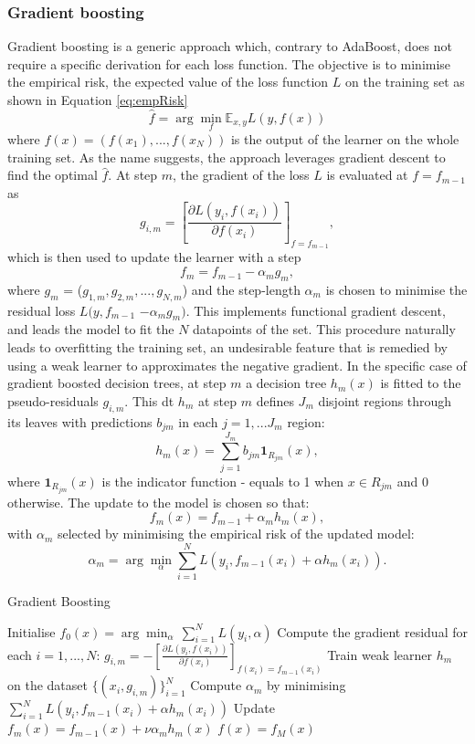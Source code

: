 \subsubsection{Gradient boosting}
Gradient boosting is a generic approach which, contrary to AdaBoost, does not require a specific derivation for each loss function. The objective is to minimise the empirical risk, the expected value of the loss function $L$ on the training set as shown in Equation \ref{eq:empRisk} 
\begin{equation}\label{eq:empRisk}
    \hat{f}  = \arg \min_f \mathbb{E}_{x,y} L(y, f(x))
\end{equation}
where $f(x) = (f(x_1), ..., f(x_N))$ is the output of the learner on the whole training set. As the name suggests, the approach leverages gradient descent to find the optimal $\hat{f}$. At step $m$, the gradient of the loss $L$ is evaluated at $f = f_{m-1}$ as \[ g_{i,m} = \left[ \frac{\partial  L(y_i, f(x_i))}{\partial f(x_i)} \right]_{f= f_{m-1}}, \] which is then used to update the learner with a step \[ f_m = f_{m-1} - \alpha_m g_{m},\] where $g_m$ = ($g_{1, m}, g_{2, m}, ..., g_{N,m}$) and the step-length $\alpha_m$ is chosen to minimise the residual loss $L(y, f_{m-1}$ $- \alpha_m g_{m})$. This implements functional gradient descent, and leads the model to fit the $N$ datapoints of the set. This procedure naturally leads to overfitting the training set, an undesirable feature that is remedied by using a weak learner to approximates the negative gradient. In the specific case of gradient boosted decision trees, at step $m$ a decision tree $h_m(x)$ is fitted to the pseudo-residuals $g_{i,m}$. This \gls{dt} $h_m$ at step $m$ defines $J_m$ disjoint regions through its leaves with predictions $b_{jm}$ in each $j = 1, ... J_m$ region: \[ h_m(x) = \sum_{j=1}^{J_m} b_{jm} \textbf{1}_{R_{jm}}(x),\] where $\textbf{1}_{R_{jm}}(x)$ is the indicator function - equals to 1 when $x \in R_{jm}$ and 0 otherwise. The update to the model is chosen so that: \[f_m(x) = f_{m-1} + \alpha_m h_m(x),\] with $\alpha_m$ selected by minimising the empirical risk of the updated model: \[ \alpha_m = \arg \min_{\alpha} \sum_{i=1}^N L(y_i, f_{m-1}(x_i) + \alpha h_m(x_i)).\]

\begin{algorithm}
    \caption{Gradient Boosting \cite{MurphyML}}
    \label{algo:gradient_boosting}
    \begin{algorithmic}
    \State Initialise $f_0(x) = \arg\min_\alpha \,\sum_{i=1}^N L(y_i, \alpha)$
        \State Compute the gradient residual for each $i= 1, ..., N$: $g_{i,m} = -\left[\frac{\partial L(y_i, f(x_i))}{\partial f(x_i)}\right]_{f(x_i) = f_{m-1}(x_i)}$
        \State Train weak learner $h_m$ on the dataset $\{(x_i, g_{i,m})\}_{i=1}^N$
        \State Compute $\alpha_m$ by minimising $\sum_{i=1}^N L(y_i, f_{m-1}(x_i) + \alpha h_m(x_i))$
        \State Update $f_m(x) = f_{m-1}(x) + \nu \alpha_m h_m(x)$
    \EndFor
    \State \Return $f(x) = f_M(x)$
    \end{algorithmic}
\end{algorithm}

